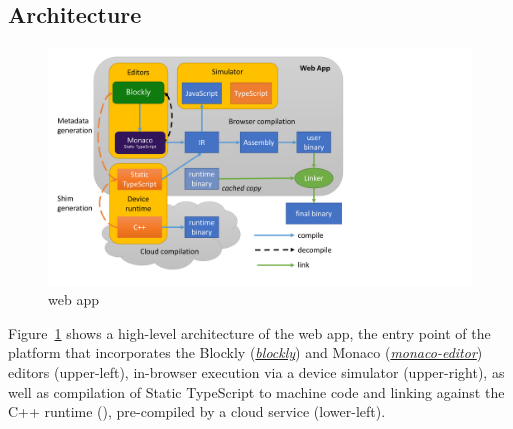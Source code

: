 

    


\subsection{Architecture}

\begin{figure}[t]
    \includegraphics[width=4.8in]{makecodeFig.pdf}
\caption{\label{fig:makecode}\MC web app}
\end{figure}

Figure~\ref{fig:makecode} shows a high-level architecture of
the \MC web app, the entry point of the platform that
incorporates the Blockly
(\emph{\href{https://github.com/google/blockly}{blockly}}) and Monaco
(\emph{\href{https://github.com/Microsoft/monaco-editor}{monaco-editor}})
editors (upper-left), in-browser execution via a device simulator (upper-right),
as well as compilation of Static TypeScript to machine code and linking against 
the C++ runtime (\emph{\CON}), pre-compiled by a cloud service (lower-left).

